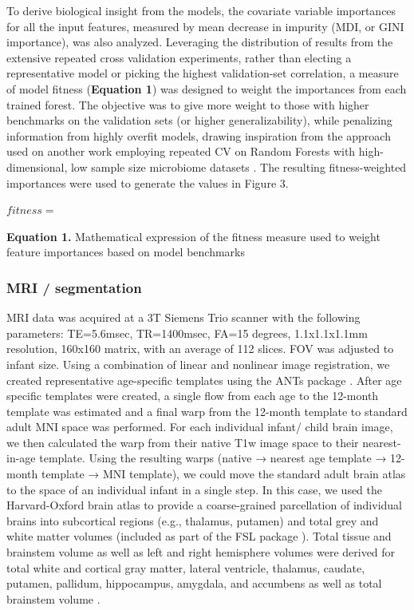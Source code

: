 \documentclass[a4paper]{article}
\begin{document}
To derive biological insight from the models, the covariate variable
importances for all the input features, measured by mean decrease in
impurity (MDI, or GINI importance), was also analyzed. Leveraging the
distribution of results from the extensive repeated cross validation
experiments, rather than electing a representative model or picking the
highest validation-set correlation, a measure of model fitness
(\textbf{Equation 1}) was designed to weight the importances from each
trained forest. The objective was to give more weight to those with
higher benchmarks on the validation sets (or higher generalizability),
while penalizing information from highly overfit models, drawing
inspiration from the approach used on another work employing repeated CV
on Random Forests with high-dimensional, low sample size microbiome
datasets \citep{woodruffInflammationAutoreactivityDefine2022}.
The resulting fitness-weighted importances were used
to generate the values in Figure 3.

\(fitness =\)

\textbf{Equation 1.} Mathematical expression of the fitness measure used
to weight feature importances based on model benchmarks

\subsubsection{MRI / segmentation}

MRI data was acquired at a 3T Siemens Trio scanner with the following
parameters: TE=5.6msec, TR=1400msec, FA=15 degrees, 1.1x1.1x1.1mm
resolution, 160x160 matrix, with an average of 112 slices. FOV was
adjusted to infant size. Using a combination of linear and nonlinear
image registration, we created representative age-specific templates
using the ANTs package \citep{avantsInsightToolKitImage2014}.
After age specific templates were created, a single flow from
each age to the 12-month template was estimated and a final warp from
the 12-month template to standard adult MNI space was performed. For
each individual infant/ child brain image, we then calculated the warp
from their native T1w image space to their nearest-in-age template.
Using the resulting warps (native → nearest age template → 12-month
template → MNI template), we could move the standard adult brain atlas
to the space of an individual infant in a single step. In this case, we
used the Harvard-Oxford brain atlas to provide a coarse-grained
parcellation of individual brains into subcortical regions (e.g.,
thalamus, putamen) and total grey and white matter volumes (included as
part of the FSL package \citep{jenkinsonFSL2012}).
Total tissue and brainstem volume as well as left and right
hemisphere volumes were derived for total white and cortical gray
matter, lateral ventricle, thalamus, caudate, putamen, pallidum,
hippocampus, amygdala, and accumbens as well as total brainstem volume
\citep{bruchhageLongitudinalBrainCognitive}.
\end{document}
